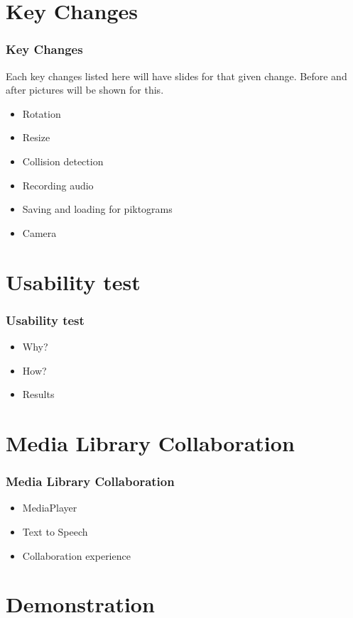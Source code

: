 \documentclass[10pt]{beamer}
\begin{document}
	\section{Key Changes}
	\begin{frame}
	\frametitle{Key Changes}
		Each key changes listed here will have slides for that given change. Before and after pictures will be shown for this.
		\begin{itemize}
		\item Rotation
		\item Resize
		\item Collision detection
		\item Recording audio
		\item Saving and loading for piktograms
		\item Camera
		\end{itemize}
	\end{frame}
	
	\section{Usability test}
		\begin{frame}
		\frametitle{Usability test}
		\begin{itemize}
			\item Why?
			\item How?
			\item Results
		\end{itemize}
	
		\end{frame}
	
	\section{Media Library Collaboration}
		\begin{frame}
		\frametitle{Media Library Collaboration}
		\begin{itemize}
			\item MediaPlayer
			\item Text to Speech
			\item Collaboration experience
		\end{itemize}

		\end{frame}
		
	\section{Demonstration}
	
\end{document}
